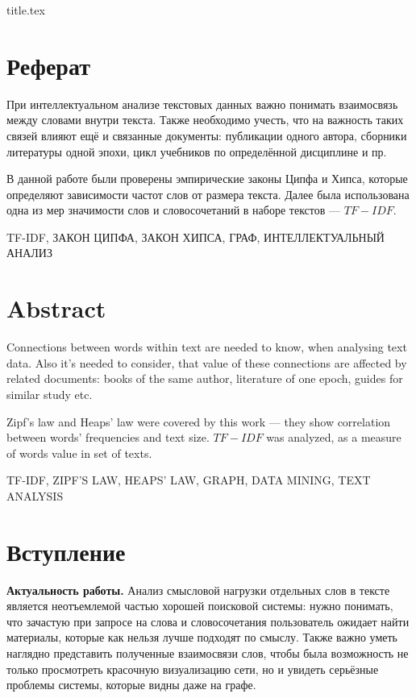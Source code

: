 



{title.tex}

\clearpage
\setcounter{page}{2}

\tableofcontents
\thispagestyle{empty}

\clearpage
\pagestyle{fancy}

\clearpage

\chapter*{Реферат}

При интеллектуальном анализе текстовых данных важно понимать взаимосвязь между
словами внутри текста.
Также необходимо учесть, что на важность таких связей влияют ещё и связанные
документы: публикации одного автора, сборники литературы одной эпохи,
цикл учебников по определённой дисциплине и пр.

В данной работе были проверены эмпирические законы Ципфа и Хипса,
которые определяют зависимости частот слов от размера текста.
Далее была использована одна из мер значимости слов и словосочетаний в наборе
текстов --- $TF-IDF$.

\MakeUppercase{TF-IDF, закон Ципфа, закон Хипса, граф, интеллектуальный анализ}
\clearpage

\chapter*{Abstract}

Connections between words within text are needed to know, when analysing text
data.
Also it's needed to consider, that value of these connections are affected
by related documents: books of the same author, literature of one epoch,
guides for similar study etc.

Zipf's law and Heaps' law were covered by this work --- they show
correlation between words' frequencies and text size.
$TF-IDF$ was analyzed, as a measure of words value in set of texts.

\MakeUppercase{TF-IDF, Zipf's law, Heaps' law, graph, data mining,
text analysis}

\clearpage
\chapter*{Вступление}
\textbf{Актуальность работы.}
Анализ смысловой нагрузки отдельных слов в тексте является неотъемлемой частью
хорошей поисковой системы:
нужно понимать, что зачастую при запросе на слова и словосочетания пользователь
ожидает найти материалы, которые как нельзя лучше подходят по смыслу.
Также важно уметь наглядно представить полученные взаимосвязи слов,
чтобы была возможность не только просмотреть красочную визуализацию сети,
но и увидеть серьёзные проблемы системы, которые видны даже на графе.

